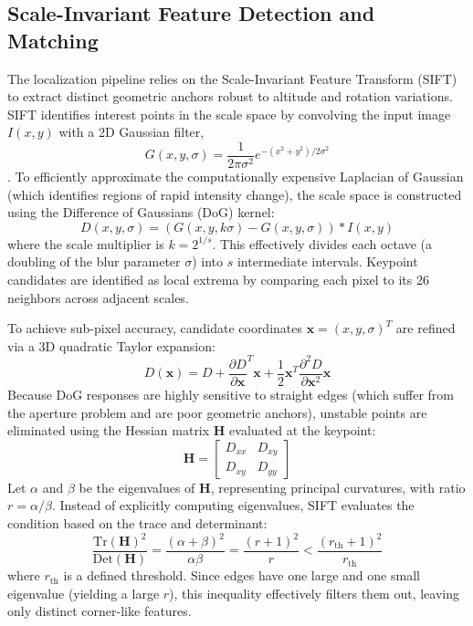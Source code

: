 \subsection{Scale-Invariant Feature Detection and Matching}\label{subsec:feature_detection}
The localization pipeline relies on the Scale-Invariant Feature Transform (SIFT) to extract distinct geometric anchors robust to altitude and rotation variations. SIFT identifies interest points in the scale space by convolving the input image $I(x, y)$ with a 2D Gaussian filter, 
\begin{equation}
G(x, y, \sigma) = \frac{1}{2\pi\sigma^2}e^{-(x^2+y^2)/2\sigma^2}
\end{equation}
. To efficiently approximate the computationally expensive Laplacian of Gaussian (which identifies regions of rapid intensity change), the scale space is constructed using the Difference of Gaussians (DoG) kernel:
\begin{equation}
D(x, y, \sigma) = (G(x, y, k\sigma) - G(x, y, \sigma)) * I(x, y)
\end{equation}
where the scale multiplier is $k = 2^{1/s}$. This effectively divides each octave (a doubling of the blur parameter $\sigma$) into $s$ intermediate intervals. Keypoint candidates are identified as local extrema by comparing each pixel to its 26 neighbors across adjacent scales. 

To achieve sub-pixel accuracy, candidate coordinates $\mathbf{x} = (x, y, \sigma)^T$ are refined via a 3D quadratic Taylor expansion:
\begin{equation}
D(\mathbf{x}) = D + \frac{\partial D}{\partial \mathbf{x}}^T \mathbf{x} + \frac{1}{2} \mathbf{x}^T \frac{\partial^2 D}{\partial \mathbf{x}^2} \mathbf{x}
\end{equation}
Because DoG responses are highly sensitive to straight edges (which suffer from the aperture problem and are poor geometric anchors), unstable points are eliminated using the Hessian matrix $\mathbf{H}$ evaluated at the keypoint:
\begin{equation}
\mathbf{H} = \begin{bmatrix} D_{xx} & D_{xy} \\ D_{xy} & D_{yy} \end{bmatrix}
\end{equation}
Let $\alpha$ and $\beta$ be the eigenvalues of $\mathbf{H}$, representing principal curvatures, with ratio $r = \alpha/\beta$. Instead of explicitly computing eigenvalues, SIFT evaluates the condition based on the trace and determinant:
\begin{equation}
\frac{\text{Tr}(\mathbf{H})^2}{\text{Det}(\mathbf{H})} = \frac{(\alpha+\beta)^2}{\alpha\beta} = \frac{(r+1)^2}{r} < \frac{(r_{\text{th}}+1)^2}{r_{\text{th}}}
\end{equation}
where $r_{\text{th}}$ is a defined threshold. Since edges have one large and one small eigenvalue (yielding a large $r$), this inequality effectively filters them out, leaving only distinct corner-like features. 


